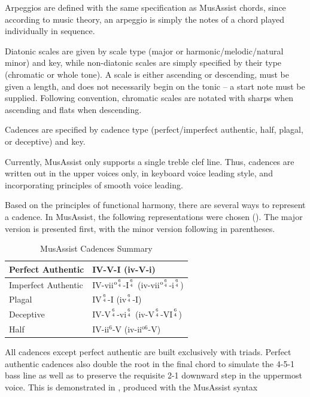 \documentclass{article}
\begin{document}
Arpeggios are defined with the same specification as MusAssist chords, since according to music theory, an arpeggio is simply the notes of a chord played individually in sequence.

Diatonic scales are given by scale type (major or harmonic/melodic/natural minor) and key, while non-diatonic scales are simply specified by their type (chromatic or whole tone). A scale is either ascending or descending, must be given a length, and does not necessarily begin on the tonic – a start note must be supplied. Following convention, chromatic scales are notated with sharps when ascending and flats when descending.

Cadences are specified by cadence type (perfect/imperfect authentic, half, plagal, or deceptive) and key.

Currently, MusAssist only supports a single treble clef line. Thus, cadences are written out in the upper voices only, in keyboard voice leading style, and incorporating principles of smooth voice leading.

Based on the principles of functional harmony, there are several ways to represent a cadence. In MusAssist, the following representations were chosen (). The major version is presented first, with the minor version following in parentheses.

\vspace{-2mm}
\begin{table}[h]
  \begin{center}
    \renewcommand{\arraystretch}{1.5}
\begin{tabular}{|l|l|}
\hline
Perfect Authentic & IV-V-I (iv-V-i) \\ \hline
Imperfect Authentic & IV-vii$^{\text{o}{6 \atop 4}}$-I$^{6 \atop 4}$ (iv-vii$^{\text{o}{6 \atop 4}}$-i$^{6 \atop 4}$) \\ \hline
Plagal & IV$^{6 \atop 4}$-I (iv$^{6 \atop 4}$-I) \\ \hline
Deceptive & IV-V$^{6 \atop 4}$-vi$^{6 \atop 4}$ (iv-V$^{6 \atop 4}$-VI$^{6 \atop 4}$) \\ \hline
Half & IV-ii$^6$-V (iv-ii$^{\text{o}6}$-V) \\ \hline
\end{tabular}
\caption{MusAssist Cadences Summary}\label{table:cadences}
\end{center}
\vspace{-7mm}
\end{table}

All cadences except perfect authentic are built exclusively with triads. Perfect authentic cadences also double the root in the final chord to simulate the 4-5-1 bass line as well as to preserve the requisite 2-1 downward step in the uppermost voice. This is demonstrated in , produced with the MusAssist syntax
\end{document}
